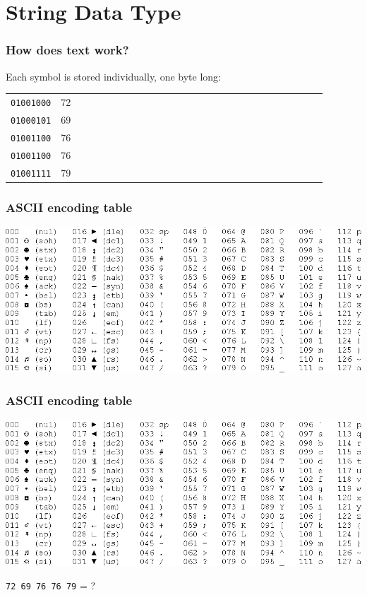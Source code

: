 \documentclass[11pt]{beamer}
\begin{document}
\section{String Data Type}

\begin{frame}
  \frametitle{How does text work?}
  \Enlarge

  \begin{itemize}
  \myitem  Each symbol is stored individually, one byte long:
    \begin{tabular}{*{27}{l}}
      \texttt{01001000} & 72 \\
      \texttt{01000101} & 69 \\
      \texttt{01001100} & 76 \\
      \texttt{01001100} & 76 \\
      \texttt{01001111} & 79 \\
    \end{tabular}
  \end{itemize}
\end{frame}

\begin{frame}
  \frametitle{ASCII encoding table}
  \Enlarge
  \includegraphics[width=\textwidth]{./img/ascii-table.png}
\end{frame}

\begin{frame}
  \frametitle{ASCII encoding table}
  \Enlarge
  \includegraphics[width=\textwidth]{./img/ascii-table.png}

  \texttt{72 69 76 76 79} = ?
\end{frame}
\end{document}
